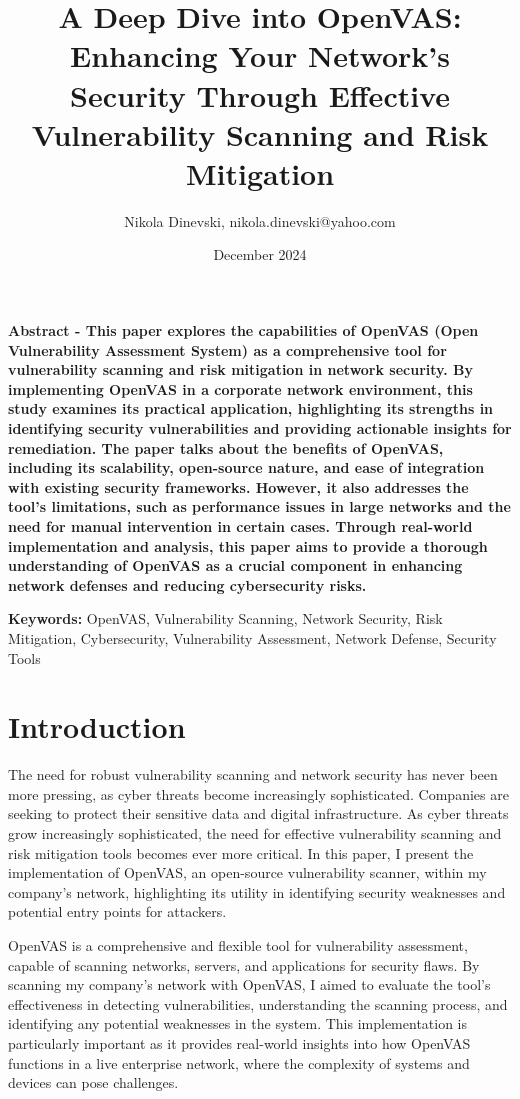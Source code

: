 \documentclass[twocolumn]{article}
\title{A Deep Dive into OpenVAS: Enhancing Your Network's Security Through Effective Vulnerability Scanning and Risk Mitigation}
\author{Nikola Dinevski, nikola.dinevski@yahoo.com}\\
\date{December 2024}
\begin{document}
\maketitle

\textbf{Abstract - This paper explores the capabilities of OpenVAS (Open Vulnerability Assessment System) as a comprehensive tool for vulnerability scanning and risk mitigation in network security. By implementing OpenVAS in a corporate network environment, this study examines its practical application, highlighting its strengths in identifying security vulnerabilities and providing actionable insights for remediation. The paper talks about the benefits of OpenVAS, including its scalability, open-source nature, and ease of integration with existing security frameworks. However, it also addresses the tool's limitations, such as performance issues in large networks and the need for manual intervention in certain cases. Through real-world implementation and analysis, this paper aims to provide a thorough understanding of OpenVAS as a crucial component in enhancing network defenses and reducing cybersecurity risks.}

\vspace{0.25em}

\textbf{Keywords:} OpenVAS, Vulnerability Scanning, Network Security, Risk Mitigation, Cybersecurity, Vulnerability Assessment, Network Defense, Security Tools

\section{Introduction}
The need for robust vulnerability scanning and network security has never been more pressing, as cyber threats become increasingly sophisticated. Companies are seeking to protect their sensitive data and digital infrastructure. As cyber threats grow increasingly sophisticated, the need for effective vulnerability scanning and risk mitigation tools becomes ever more critical. In this paper, I present the implementation of OpenVAS, an open-source vulnerability scanner, within my company's network, highlighting its utility in identifying security weaknesses and potential entry points for attackers.

OpenVAS is a comprehensive and flexible tool for vulnerability assessment, capable of scanning networks, servers, and applications for security flaws. By scanning my company’s network with OpenVAS, I aimed to evaluate the tool’s effectiveness in detecting vulnerabilities, understanding the scanning process, and identifying any potential weaknesses in the system. This implementation is particularly important as it provides real-world insights into how OpenVAS functions in a live enterprise network, where the complexity of systems and devices can pose challenges.
\end{document}
